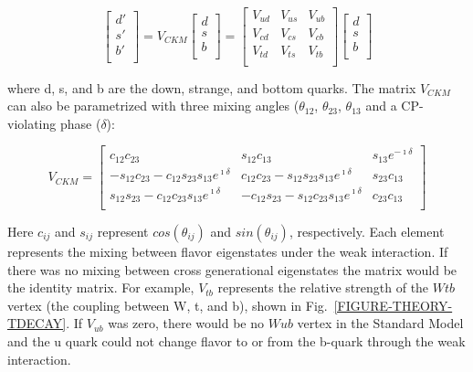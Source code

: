 \begin{equation}\label{EQUATION-THEORY-CKM}
\begin{bmatrix}d'\\s'\\b'\\\end{bmatrix} =  V_{CKM}\begin{bmatrix} d\\s\\b\\\end{bmatrix} = \begin{bmatrix} V_{ud} & V_{us} & V_{ub}\\ V_{cd}& V_{cs}& V_{cb}\\V_{td}& V_{ts}& V_{tb}\\\end{bmatrix} \begin{bmatrix} d\\s\\b\\\end{bmatrix}
\end{equation}

\noindent
where d, s, and b are the down, strange, and bottom quarks. The matrix $V_{CKM}$ can also be parametrized with three mixing angles ($\theta_{12}$, $\theta_{23}$, $\theta_{13}$ and a CP-violating phase ($\delta$):

\begin{equation}\label{EQUATION-THEORY-CKMMATRIX2}
V_{CKM} =  \begin{bmatrix} c_{12}c_{23} & s_{12}c_{13} & s_{13}e^{-\imath\delta}\\ -s_{12}c_{23}-c_{12}s_{23}s_{13}e^{\imath\delta} & c_{12}c_{23} - s_{12}s_{23}s_{13}e^{\imath\delta} & s_{23}c_{13}\\s_{12}s_{23}-c_{12}c_{23}s_{13}e^{\imath\delta} & -c_{12}s_{23}-s_{12}c_{23}s_{13}e^{\imath\delta} & c_{23}c_{13}\\\end{bmatrix}
\end{equation}

\noindent
Here $c_{ij}$ and $s_{ij}$ represent $cos(\theta_{ij})$ and $sin(\theta_{ij})$, respectively. Each element represents the mixing between flavor eigenstates under the weak interaction. If there was no mixing between cross generational eigenstates the matrix would be the identity matrix. For example, $V_{tb}$ represents the relative strength of the $Wtb$ vertex (the coupling between W, t, and b), shown in Fig.~\ref{FIGURE-THEORY-TDECAY}.  If $V_{ub}$ was zero, there would be no $Wub$ vertex in the Standard Model and the u quark could not change flavor to or from the b-quark through the weak interaction. 

